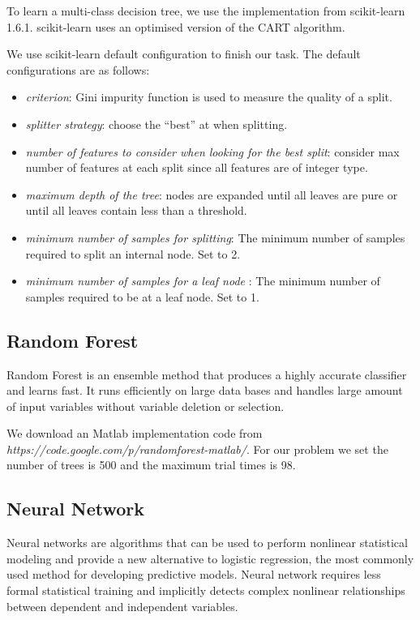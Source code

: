 \documentclass[letterpaper,11pt,twocolumn]{article}
\begin{document}
To learn a multi-class decision tree, we use the implementation from scikit-learn 1.6.1. scikit-learn uses an optimised version of the CART algorithm.

We use scikit-learn default configuration to finish our task. The default configurations are as follows:

\begin{itemize}
\item \emph{criterion}: Gini impurity function is used to measure the quality of a split.
\item \emph{splitter strategy}: choose the “best” at when splitting.
\item \emph{number of features to consider when looking for the best split}: consider max number of features at each split since all features are of integer type.
\item \emph{maximum depth of the tree}: nodes are expanded until all leaves are pure or until all leaves contain less than a threshold.
\item \emph{minimum number of samples for splitting}: The minimum number of samples required to split an internal node. Set to 2.
\item \emph{minimum number of samples for a leaf node }: The minimum number of samples required to be at a leaf node. Set to 1.

\end{itemize}
\subsection{Random Forest}
Random Forest is an ensemble method that produces a highly accurate classifier and learns fast. It runs efficiently on large data bases and handles large amount of input variables without variable deletion or selection.

We download an Matlab implementation code from \emph{https://code.google.com/p/randomforest-matlab/}. For our problem we set the number of trees is 500 and the maximum trial times is 98.

\subsection{Neural Network}
Neural networks are algorithms that can be used to perform nonlinear statistical modeling and provide a new alternative to logistic regression, the most commonly used method for developing predictive models. Neural network requires less formal statistical training and implicitly detects complex nonlinear relationships between dependent and independent variables.
\end{document}
